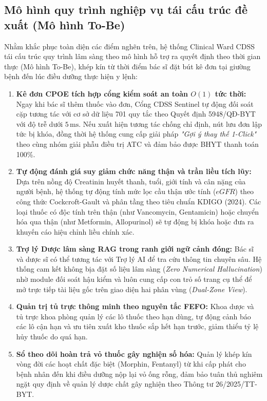 \subsection{Mô hình quy trình nghiệp vụ tái cấu trúc đề xuất (Mô hình To-Be)}
\label{subsec:to_be_workflow}

Nhằm khắc phục toàn diện các điểm nghẽn trên, hệ thống Clinical Ward CDSS tái cấu trúc quy trình lâm sàng theo mô hình hỗ trợ ra quyết định theo thời gian thực (Mô hình To-Be), khép kín từ thời điểm bác sĩ đặt bút kê đơn tại giường bệnh đến lúc điều dưỡng thực hiện y lệnh:

\begin{enumerate}[leftmargin=1.8em]
    \item \textbf{Kê đơn CPOE tích hợp cổng kiểm soát an toàn $O(1)$ tức thời:} Ngay khi bác sĩ thêm thuốc vào đơn, Cổng CDSS Sentinel tự động đối soát cặp tương tác với cơ sở dữ liệu 701 quy tắc theo Quyết định 5948/QĐ-BYT với độ trễ dưới $5\,\text{ms}$. Nếu xuất hiện tương tác chống chỉ định, nút lưu đơn lập tức bị khóa, đồng thời hệ thống cung cấp giải pháp \textit{"Gợi ý thay thế 1-Click"} theo cùng nhóm giải phẫu điều trị ATC và đảm bảo được BHYT thanh toán 100\%.
    \item \textbf{Tự động đánh giá suy giảm chức năng thận và trần liều tích lũy:} Dựa trên nồng độ Creatinin huyết thanh, tuổi, giới tính và cân nặng của người bệnh, hệ thống tự động tính mức lọc cầu thận ước tính ($eGFR$) theo công thức Cockcroft-Gault và phân tầng theo tiêu chuẩn KDIGO (2024). Các loại thuốc có độc tính trên thận (như Vancomycin, Gentamicin) hoặc chuyển hóa qua thận (như Metformin, Allopurinol) sẽ tự động bị khóa hoặc đưa ra khuyến cáo hiệu chỉnh liều chính xác.
    \item \textbf{Trợ lý Dược lâm sàng RAG trong ranh giới ngữ cảnh đóng:} Bác sĩ và dược sĩ có thể tương tác với Trợ lý AI để tra cứu thông tin chuyên sâu. Hệ thống cam kết không bịa đặt số liệu lâm sàng (\textit{Zero Numerical Hallucination}) nhờ module đối soát hậu kiểm và luôn cung cấp con trỏ số trang cụ thể để mở trực tiếp tài liệu gốc trên giao diện hai phân vùng (\textit{Dual-Zone View}).
    \item \textbf{Quản trị tủ trực thông minh theo nguyên tắc FEFO:} Khoa dược và tủ trực khoa phòng quản lý các lô thuốc theo hạn dùng, tự động cảnh báo các lô cận hạn và ưu tiên xuất kho thuốc sắp hết hạn trước, giảm thiểu tỷ lệ hủy thuốc do quá hạn.
    \item \textbf{Sổ theo dõi hoàn trả vỏ thuốc gây nghiện số hóa:} Quản lý khép kín vòng đời các hoạt chất đặc biệt (Morphin, Fentanyl) từ khi cấp phát cho bệnh nhân đến khi điều dưỡng nộp lại vỏ ống rỗng, đảm bảo tuân thủ nghiêm ngặt quy định về quản lý dược chất gây nghiện theo Thông tư 26/2025/TT-BYT.
\end{enumerate}

